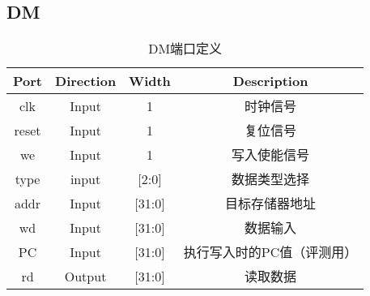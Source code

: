 \documentclass[UTF8]{ctexart}
\begin{document}
\subsection{DM}
\begin{table}[H]
	\centering
	\begin{threeparttable}
		\caption{DM端口定义}
		\begin{tabular}{cccc}
			\toprule
			\rowcolor{mypink}
			\textbf{Port} & \textbf{Direction} & \textbf{Width} & \textbf{Description}       \\
			\midrule
			clk           & Input              & 1              & 时钟信号                   \\
			\midrule
			reset         & Input              & 1              & 复位信号                   \\
			\midrule
			we            & Input              & 1              & 写入使能信号               \\
			\midrule
			type          & input              & [2:0]          & 数据类型选择               \\
			\midrule
			addr          & Input              & [31:0]         & 目标存储器地址             \\
			\midrule
			wd            & Input              & [31:0]         & 数据输入                   \\
			\midrule
			PC            & Input              & [31:0]         & 执行写入时的PC值（评测用） \\
			\midrule
			rd            & Output             & [31:0]         & 读取数据                   \\
			\midrule
		\end{tabular}
	\end{threeparttable}
\end{table}
\end{document}
